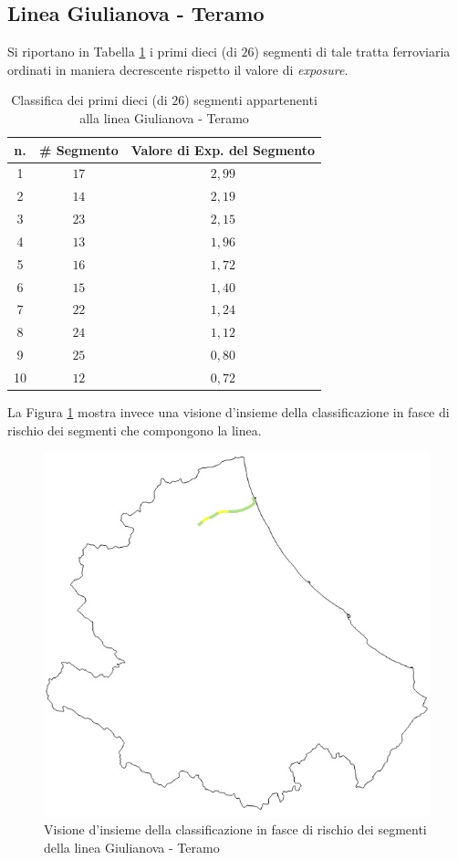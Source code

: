 \subsection{Linea Giulianova - Teramo}
Si riportano in Tabella \ref{classificagiulianovateramo} i primi dieci (di $26$) segmenti di tale tratta ferroviaria ordinati in maniera decrescente rispetto il valore di \textit{exposure}.
\begin{table}[hpt]
\centering
\begin{tabular}{|c|c|c|}
\hline
\rowcolor{lightgray}
n. & \# Segmento & Valore di Exp. del Segmento \\ \hline \rowcolor{icterine}
1  & $17$        & $2,99$                      \\ \hline \rowcolor{icterine}
2  & $14$        & $2,19$                      \\ \hline \rowcolor{icterine}
3  & $23$        & $2,15$                      \\ \hline \rowcolor{icterine}
4  & $13$        & $1,96$                      \\ \hline \rowcolor{icterine}
5  & $16$        & $1,72$                      \\ \hline \rowcolor{icterine}
6  & $15$        & $1,40$                      \\ \hline \rowcolor{icterine}
7  & $22$       & $1,24$                      \\ \hline \rowcolor{icterine}
8  & $24$        & $1,12$                      \\ \hline \rowcolor{inchworm}
9  & $25$        & $0,80$                      \\ \hline \rowcolor{inchworm}
10 & $12$        & $0,72$                      \\ \hline
\end{tabular}
\caption{Classifica dei primi dieci (di $26$) segmenti appartenenti alla linea Giulianova - Teramo}
\label{classificagiulianovateramo}
\end{table}
\newline
La Figura \ref{giulianovateramo} mostra invece una visione d'insieme della classificazione in fasce di rischio dei segmenti che compongono la linea.
\begin{figure}[h]
\centering
\includegraphics[width=0.4\linewidth]{img/teramogiulianova.jpeg}
\caption{Visione d'insieme della classificazione in fasce di rischio dei segmenti della linea Giulianova - Teramo}
\label{giulianovateramo}
\end{figure}
